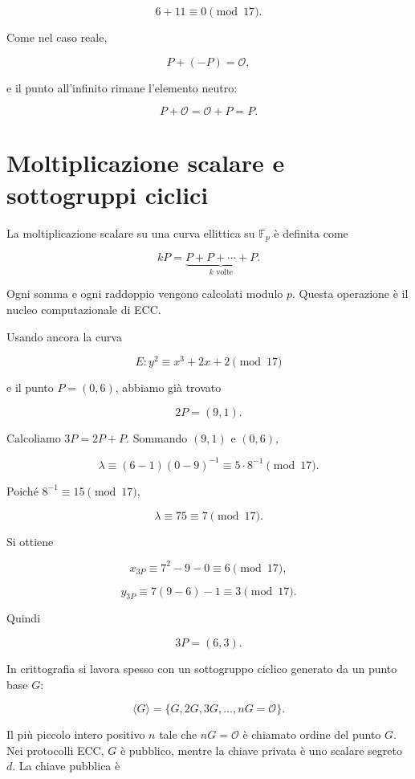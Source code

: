 \documentclass[12pt,a4paper,oneside]{report}
\begin{document}
\[
6+11\equiv 0\pmod{17}.
\]

Come nel caso reale,

\[
P+(-P)=\mathcal{O},
\]

e il punto all'infinito rimane l'elemento neutro:

\[
P+\mathcal{O}=\mathcal{O}+P=P.
\]

\section{Moltiplicazione scalare e sottogruppi ciclici}

La moltiplicazione scalare su una curva ellittica su \(\mathbb{F}_p\) è definita come

\begin{equation}
    kP=\underbrace{P+P+\cdots+P}_{k\text{ volte}}.
\end{equation}

Ogni somma e ogni raddoppio vengono calcolati modulo \(p\). Questa operazione è il nucleo computazionale di ECC.

Usando ancora la curva

\[
E: y^2\equiv x^3+2x+2\pmod{17}
\]

e il punto \(P=(0,6)\), abbiamo già trovato

\[
2P=(9,1).
\]

Calcoliamo \(3P=2P+P\). Sommando \((9,1)\) e \((0,6)\),

\[
\lambda \equiv (6-1)(0-9)^{-1}\equiv 5\cdot 8^{-1}\pmod{17}.
\]

Poiché \(8^{-1}\equiv 15\pmod{17}\),

\[
\lambda\equiv 75\equiv 7\pmod{17}.
\]

Si ottiene

\[
x_{3P}\equiv 7^2-9-0\equiv 6\pmod{17},
\]

\[
y_{3P}\equiv 7(9-6)-1\equiv 3\pmod{17}.
\]

Quindi

\[
3P=(6,3).
\]

In crittografia si lavora spesso con un sottogruppo ciclico generato da un punto base \(G\):

\begin{equation}
    \langle G\rangle=\{G,2G,3G,\ldots,nG=\mathcal{O}\}.
\end{equation}

Il più piccolo intero positivo \(n\) tale che \(nG=\mathcal{O}\) è chiamato ordine del punto \(G\). Nei protocolli ECC, \(G\) è pubblico, mentre la chiave privata è uno scalare segreto \(d\). La chiave pubblica è
\end{document}
